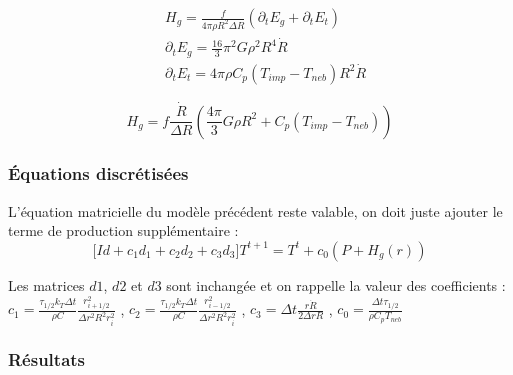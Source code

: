 \documentclass[10pt,a4paper]{article}
\numberwithin{equation}{section}
\begin{document}
\begin{align}
 &H_g = \frac{f}{4 \pi \rho R^2 \Delta R}(\partial_{t} E_g + \partial_{t} E_t) \\
 &\partial_{t} E_g =\frac{16}{3} \pi^2 G \rho^2 R^4 \dot R \\
 &\partial_{t} E_t = 4 \pi \rho C_p ( T_{imp} - T_{neb} ) R^2 \dot R
\end{align}

\begin{equation}
H_g = f\frac{\dot R}{\Delta R}(\frac{4 \pi}{3} G\rho R^2 + C_p ( T_{imp} - T_{neb} ) )
\end{equation}


\subsubsection{Équations discrétisées}

L'équation matricielle du modèle précédent reste valable, on doit juste ajouter le terme de production supplémentaire :
\begin{equation}
\Big [ Id + 
c_1  d_1 +  
c_2  d_2 +
c_3  d_3
 \Big] T^{t+1} = T^t + c_0 (P + H_g(r))
\end{equation}

Les matrices $d1$, $d2$ et $d3$ sont inchangée et on rappelle la valeur des coefficients : \\
$c_1 = \frac{\tau_{1/2} k_T \Delta t }{\rho C  }
\frac{r^2_{i+1/2}}{\Delta r^2 R^2 r^2_i}$
, $c_2 = \frac{\tau_{1/2} k_T \Delta t }{\rho C  }
\frac{r^2_{i-1/2}}{\Delta r^2 R^2 r^2_i}$
, $c_3 = \Delta t \frac{ r \dot{R}}{2\Delta r R}$
, $c_0 = \frac{\Delta t \tau_{1/2} }{\rho C_p T_{neb}}$ 


\subsubsection{Résultats}
\end{document}
